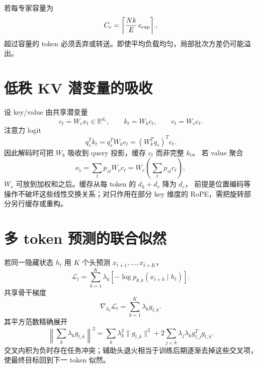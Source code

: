 \documentclass[11pt]{article}
\numberwithin{equation}{section}
\newcommand{\R}{\mathbb{R}}
\newcommand{\1}{\mathbf{1}}
\newcommand{\cL}{\mathcal{L}}
\begin{document}
若每专家容量为
\begin{equation}
 C_e=\left\lceil\frac{Nk}{E}\,c_{\rm cap}\right\rceil,
\end{equation}
超过容量的 token 必须丢弃或转送。即使平均负载均匀，局部批次方差仍可能溢出。

\section{低秩 KV 潜变量的吸收}

设 key/value 由共享潜变量
\begin{equation}
 c_t=W_cx_t\in\R^{d_c},\qquad
 k_t=W_kc_t,\qquad v_t=W_vc_t.
\end{equation}
注意力 logit
\begin{equation}
 q_s^Tk_t=q_s^TW_kc_t=(W_k^Tq_s)^Tc_t.
\end{equation}
因此解码时可把 $W_k$ 吸收到 query 投影，缓存 $c_t$ 而非完整 $k_t$。
若 value 聚合
\begin{equation}
 o_s=\sum_tp_{st}W_vc_t=W_v\left(\sum_tp_{st}c_t\right),
\end{equation}
$W_v$ 可放到加权和之后。缓存从每 token 的 $d_k+d_v$ 降为 $d_c$，
前提是位置编码等操作不破坏这些线性交换关系；对只作用在部分 key 维度的 RoPE，需把旋转部分另行缓存或重构。

\section{多 token 预测的联合似然}

若同一隐藏状态 $h_t$ 用 $K$ 个头预测 $x_{t+1},\ldots,x_{t+K}$，
\begin{equation}
 \cL_t=\sum_{k=1}^{K}\lambda_k
 [-\log p_{\theta,k}(x_{t+k}\mid h_t)].
\end{equation}
共享骨干梯度
\begin{equation}
 \nabla_{h_t}\cL_t=\sum_{k=1}^{K}\lambda_k g_{t,k}.
\end{equation}
其平方范数精确展开
\begin{equation}
 \left\|\sum_k\lambda_kg_{t,k}\right\|^2
 =\sum_k\lambda_k^2\|g_{t,k}\|^2
 +2\sum_{j<k}\lambda_j\lambda_k g_{t,j}^Tg_{t,k}.
\end{equation}
交叉内积为负时存在任务冲突；辅助头退火相当于训练后期逐渐去掉这些交叉项，
使最终目标回到下一 token 似然。
\end{document}
